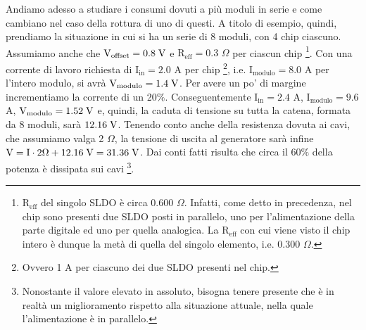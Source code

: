 Andiamo adesso a studiare i consumi dovuti a più moduli in serie e come cambiano nel caso della rottura di uno di questi.
A titolo di esempio, quindi, prendiamo la situazione in cui si ha un serie di 8 moduli, con 4 chip ciascuno.
Assumiamo anche che $\mathrm{V_{offset}=0.8} \rm \; V$ e $\mathrm{R_{eff}=0.3}$ $\Omega$ per ciascun chip
\footnote{
  $\mathrm{R_{eff}}$ del singolo SLDO è circa 0.600 $\Omega$.
  Infatti, come detto in precedenza, nel chip sono presenti due SLDO posti in parallelo, uno per l'alimentazione della parte digitale ed uno per quella analogica.
  La $\mathrm{R_{eff}}$ con cui viene visto il chip intero è dunque la metà di quella del singolo elemento, i.e. 0.300 $\Omega$.
}.
Con una corrente di lavoro richiesta di $\mathrm{I_{in}=2.0}$ A per chip
\footnote{
  Ovvero 1 A per ciascuno dei due SLDO presenti nel chip.
},
i.e. $\mathrm{I_{modulo}=8.0}$ A per l'intero modulo, si avrà $\mathrm{V_{modulo}=1.4} \rm \; V$.
Per avere un po' di margine incrementiamo la corrente di un 20$\%$.
Conseguentemente $\mathrm{I_{in}=2.4}$ A, $\mathrm{I_{modulo}=9.6}$ A, $\mathrm{V_{modulo}=1.52} \rm \; V$ e, quindi, la caduta di tensione su tutta la catena, formata da 8 moduli, sarà $12.16 \rm \; V$.
Tenendo conto anche della resistenza dovuta ai cavi, che assumiamo valga 2 $\Omega$, la tensione di uscita al generatore sarà infine $\mathrm{V=I \cdot 2 \Omega +12.16 \rm \; V=31.36 \rm \; V}$.
  Dai conti fatti risulta che circa il $60 \%$ della potenza è dissipata sui cavi
\footnote{
  Nonostante il valore elevato in assoluto, bisogna tenere presente che è in realtà un miglioramento rispetto alla situazione attuale, nella quale l'alimentazione è in parallelo.
}. %

